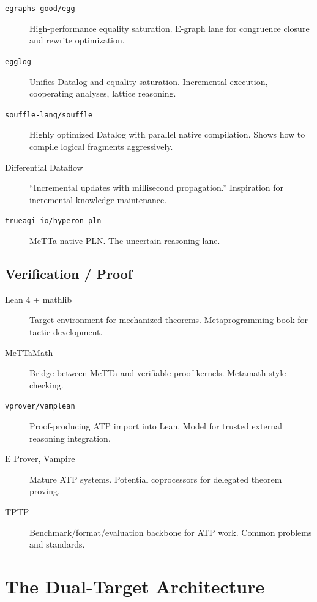 \documentclass[11pt]{article}
\newcommand{\code}[1]{\texttt{#1}}
\begin{document}
\begin{description}
\item[\code{egraphs-good/egg}]
  High-performance equality saturation.  E-graph lane for congruence
  closure and rewrite optimization.

\item[\code{egglog}]
  Unifies Datalog and equality saturation.  Incremental execution,
  cooperating analyses, lattice reasoning.

\item[\code{souffle-lang/souffle}]
  Highly optimized Datalog with parallel native compilation.  Shows
  how to compile logical fragments aggressively.

\item[Differential Dataflow]
  ``Incremental updates with millisecond propagation.''  Inspiration
  for incremental knowledge maintenance.

\item[\code{trueagi-io/hyperon-pln}]
  MeTTa-native PLN.  The uncertain reasoning lane.
\end{description}

\subsection{Verification / Proof}

\begin{description}
\item[Lean 4 + mathlib]
  Target environment for mechanized theorems.  Metaprogramming book
  for tactic development.

\item[MeTTaMath]
  Bridge between MeTTa and verifiable proof kernels.  Metamath-style
  checking.

\item[\code{vprover/vamplean}]
  Proof-producing ATP import into Lean.  Model for trusted external
  reasoning integration.

\item[E Prover, Vampire]
  Mature ATP systems.  Potential coprocessors for delegated theorem
  proving.

\item[TPTP]
  Benchmark/format/evaluation backbone for ATP work.  Common problems
  and standards.
\end{description}

\section{The Dual-Target Architecture}
\label{sec:dual-target}
\end{document}
